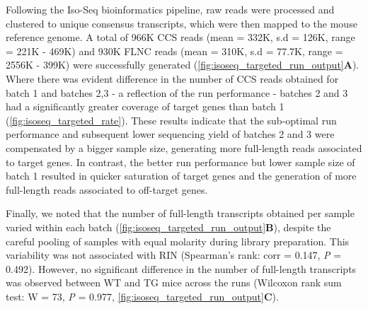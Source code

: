 Following the Iso-Seq bioinformatics pipeline, raw reads were processed and clustered to unique consensus transcripts, which were then mapped to the mouse reference genome. A total of 966K CCS reads (mean = 332K, s.d = 126K, range =  221K - 469K) and 930K FLNC reads (mean = 310K, s.d = 77.7K, range = 2556K - 399K) were successfully generated (\cref{fig:isoseq_targeted_run_output}\textbf{A}). Where there was evident difference in the number of CCS reads obtained for batch 1 and batches 2,3 - a reflection of the run performance - batches 2 and 3 had a significantly greater coverage of target genes than batch 1 (\cref{fig:isoseq_targeted_rate}). These results indicate that the sub-optimal run performance and subsequent lower sequencing yield of batches 2 and 3 were compensated by a bigger sample size, generating more full-length reads associated to target genes. In contrast, the better run performance but lower sample size of batch 1 resulted in quicker saturation of target genes and the generation of more full-length reads associated to off-target genes. 

Finally, we noted that the number of full-length transcripts obtained per sample varied within each batch (\cref{fig:isoseq_targeted_run_output}\textbf{B}), despite the careful pooling of samples with equal molarity during library preparation. This variability was not associated with RIN (Spearman's rank: corr = 0.147, \textit{P} = 0.492). However, no significant difference in the number of full-length transcripts was observed between WT and TG mice across the runs (Wilcoxon rank sum test: W = 73, \textit{P} = 0.977, \cref{fig:isoseq_targeted_run_output}\textbf{C}). 


